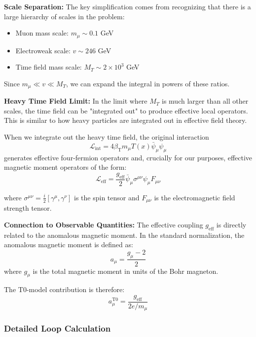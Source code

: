 \documentclass[12pt,a4paper]{article}
\newcommand{\Tfield}{T(x)}
\newcommand{\betaT}{\beta_{\text{T}}}
\begin{document}
	\textbf{Scale Separation:} The key simplification comes from recognizing that there is a large hierarchy of scales in the problem:
	\begin{itemize}
		\item Muon mass scale: $m_\mu \sim 0.1$ GeV
		\item Electroweak scale: $v \sim 246$ GeV  
		\item Time field mass scale: $M_T \sim 2 \times 10^3$ GeV
	\end{itemize}
	
	Since $m_\mu \ll v \ll M_T$, we can expand the integral in powers of these ratios.
	
	\textbf{Heavy Time Field Limit:} In the limit where $M_T$ is much larger than all other scales, the time field can be "integrated out" to produce effective local operators. This is similar to how heavy particles are integrated out in effective field theory.
	
	When we integrate out the heavy time field, the original interaction
	\begin{equation}
		\mathcal{L}_{\text{int}} = 4\betaT m_\mu \Tfield \bar{\psi}_\mu \psi_\mu
	\end{equation}
	generates effective four-fermion operators and, crucially for our purposes, effective magnetic moment operators of the form:
	\begin{equation}
		\mathcal{L}_{\text{eff}} = \frac{g_{\text{eff}}}{2} \bar{\psi}_\mu \sigma^{\mu\nu} \psi_\mu F_{\mu\nu}
	\end{equation}
	
	where $\sigma^{\mu\nu} = \frac{i}{2}[\gamma^\mu, \gamma^\nu]$ is the spin tensor and $F_{\mu\nu}$ is the electromagnetic field strength tensor.
	
	\textbf{Connection to Observable Quantities:} The effective coupling $g_{\text{eff}}$ is directly related to the anomalous magnetic moment. In the standard normalization, the anomalous magnetic moment is defined as:
	\begin{equation}
		a_\mu = \frac{g_\mu - 2}{2}
	\end{equation}
	where $g_\mu$ is the total magnetic moment in units of the Bohr magneton.
	
	The T0-model contribution is therefore:
	\begin{equation}
		a_\mu^{\text{T0}} = \frac{g_{\text{eff}}}{2e/m_\mu}
	\end{equation}
	
	\subsubsection{Detailed Loop Calculation}
	
\end{document}
